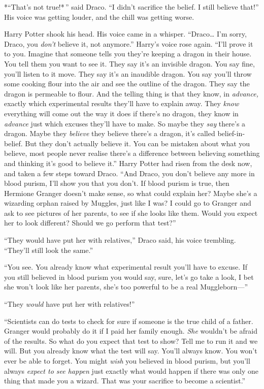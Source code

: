 *``That's not true!* '' said Draco. ``I didn't sacrifice the belief. I
still believe that!'' His voice was getting louder, and the chill was
getting worse.

Harry Potter shook his head. His voice came in a whisper.
``Draco\ldots{} I'm sorry, Draco, you \emph{don't} believe it, not
anymore.'' Harry's voice rose again. ``I'll prove it to you. Imagine
that someone tells you they're keeping a dragon in their house. You tell
them you want to see it. They say it's an invisible dragon. You say
fine, you'll listen to it move. They say it's an inaudible dragon. You
say you'll throw some cooking flour into the air and see the outline of
the dragon. They say the dragon is permeable to flour. And the telling
thing is that they know, in \emph{advance,} exactly which experimental
results they'll have to explain away. They \emph{know} everything will
come out the way it does if there's no dragon, they know in
\emph{advance} just which excuses they'll have to make. So maybe they
\emph{say} there's a dragon. Maybe they \emph{believe} they believe
there's a dragon, it's called belief-in-belief. But they don't actually
believe it. You can be mistaken about what you believe, most people
never realise there's a difference between believing something and
thinking it's good to believe it.'' Harry Potter had risen from the desk
now, and taken a few steps toward Draco. ``And Draco, you don't believe
any more in blood purism, I'll show you that you don't. If blood purism
is true, then Hermione Granger doesn't make sense, so what could explain
her? Maybe she's a wizarding orphan raised by Muggles, just like I was?
I could go to Granger and ask to see pictures of her parents, to see if
she looks like them. Would you expect her to look different? Should we
go perform that test?''

``They would have put her with relatives,'' Draco said, his voice
trembling. ``They'll still look the same.''

``You see. You already know what experimental result you'll have to
excuse. If you still believed in blood purism you would say, sure, let's
go take a look, I bet she won't look like her parents, she's too
powerful to be a real Muggleborn---''

``They \emph{would} have put her with relatives!''

``Scientists can do tests to check for sure if someone is the true child
of a father. Granger would probably do it if I paid her family enough.
\emph{She} wouldn't be afraid of the results. So what do you expect that
test to show? Tell me to run it and we will. But you already know what
the test will say. You'll always know. You won't ever be able to forget.
You might \emph{wish} you believed in blood purism, but you'll always
\emph{expect to see happen} just exactly what would happen if there was
only one thing that made you a wizard. That was your sacrifice to become
a scientist.''


